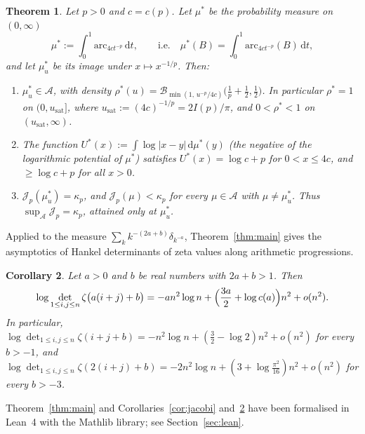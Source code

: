 \documentclass{amsart}
\newtheorem{theorem}{Theorem}[section]
\newtheorem{corollary}[theorem]{Corollary}
\theoremstyle{definition}
\theoremstyle{remark}
\numberwithin{equation}{section}
\newcommand{\cA}{\mathcal{A}}
\newcommand{\cJ}{\mathcal{J}}
\newcommand{\cB}{\mathcal{B}}
\newcommand{\dd}{\,\mathrm{d}}
\newcommand{\arc}{\mathrm{arc}}
\newcommand{\usat}{u_{\mathrm{sat}}}
\begin{document}
\begin{theorem}\label{thm:equilibrium}
Let $p>0$ and $c=c(p)$. Let $\mu^*$ be the probability measure on $(0,\infty)$
\[
  \mu^*:=\int_0^1\arc_{4ct^{-p}}\dd t,\qquad\text{i.e.}\quad\mu^*(B)=\int_0^1\arc_{4ct^{-p}}(B)\dd t,
\]
and let $\mu^*_u$ be its image under $x\mapsto x^{-1/p}$. Then:
\begin{enumerate}
\item $\mu^*_u\in\cA$, with density
  $\rho^*(u)=\cB_{\min(1,\,u^{-p}/4c)}\bigl(\tfrac1p+\tfrac12,\tfrac12\bigr)$. In particular $\rho^*=1$ on
  $(0,\usat]$, where $\usat:=(4c)^{-1/p}=2I(p)/\pi$, and $0<\rho^*<1$ on $(\usat,\infty)$.
\item The function $U^*(x):=\int\log|x-y|\dd\mu^*(y)$ (the negative of the logarithmic potential of $\mu^*$) satisfies
  $U^*(x)=\log c+p$ for $0<x\le4c$, and
  $\ge\log c+p$ for all $x>0$.
\item $\cJ_p(\mu^*_u)=\kappa_p$, and $\cJ_p(\mu)<\kappa_p$ for every $\mu\in\cA$ with $\mu\neq\mu^*_u$. Thus
  $\sup_{\cA}\cJ_p=\kappa_p$, attained only at $\mu^*_u$.
\end{enumerate}
\end{theorem}

Applied to the measure $\sum_kk^{-(2a+b)}\delta_{k^{-a}}$, Theorem~\ref{thm:main} gives the asymptotics of Hankel
determinants of zeta values along arithmetic progressions.

\begin{corollary}\label{cor:zeta}
Let $a>0$ and $b$ be real numbers with $2a+b>1$. Then
\[
  \log\det_{1\le i,j\le n}\zeta\bigl(a(i+j)+b\bigr)=-an^2\log n+\Bigl(\frac{3a}{2}+\log c(a)\Bigr)n^2+o(n^2).
\]
In particular, $\log\det_{1\le i,j\le n}\zeta(i+j+b)=-n^2\log n+(\frac32-\log2)n^2+o(n^2)$ for every $b>-1$, and
$\log\det_{1\le i,j\le n}\zeta(2(i+j)+b)=-2n^2\log n+(3+\log\frac{\pi^2}{16})n^2+o(n^2)$ for every $b>-3$.
\end{corollary}

Theorem~\ref{thm:main} and Corollaries~\ref{cor:jacobi} and~\ref{cor:zeta} have been formalised in Lean~4 with the
Mathlib library; see Section~\ref{sec:lean}.
\end{document}
